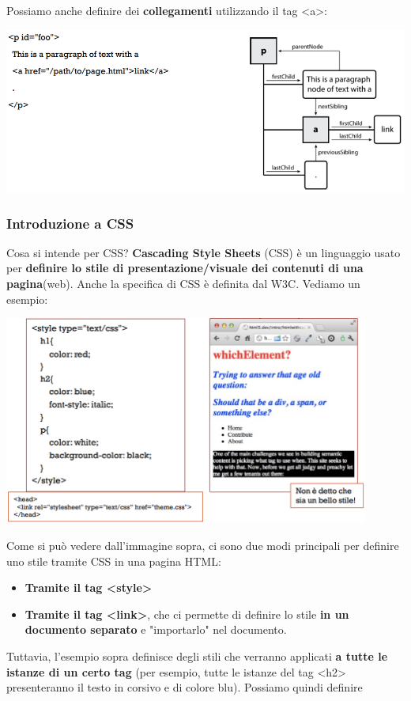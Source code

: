 \documentclass[12pt]{article}
\begin{document}
Possiamo anche definire dei \textbf{collegamenti} utilizzando il tag <a>:
\begin{center}
    \includegraphics[width = 1.05\textwidth]{Images/157.PNG}
\end{center}
\newpage
\subsubsection{Introduzione a CSS}
Cosa si intende per CSS? \textbf{Cascading Style Sheets} (CSS) è un linguaggio usato per \textbf{definire lo stile di presentazione/visuale dei contenuti di una pagina}(web).
Anche la specifica di CSS è definita dal W3C. Vediamo un esempio:
\begin{center}
    \includegraphics[width = 0.90\textwidth]{Images/158.PNG}
\end{center}
Come si può vedere dall'immagine sopra, ci sono due modi principali per definire uno stile tramite CSS in una pagina HTML:
\begin{itemize}
    \item \textbf{Tramite il tag <style>}
    \item \textbf{Tramite il tag <link>}, che ci permette di definire lo stile \textbf{in un documento separato} e "importarlo" nel documento.
\end{itemize}
Tuttavia, l'esempio sopra definisce degli stili che verranno applicati \textbf{a tutte le istanze di un certo tag} (per esempio, tutte le istanze del tag <h2> presenteranno il testo in corsivo e di colore blu). Possiamo quindi definire
\end{document}
